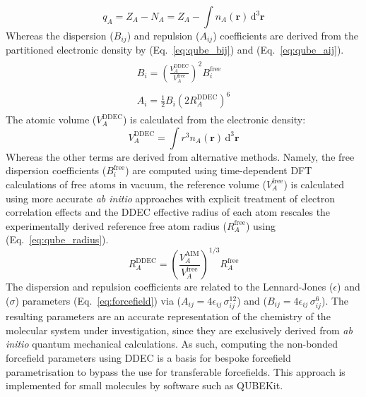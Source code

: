 %
\begin{equation} \label{eq:ddec_charge}
    q_A = Z_A - N_A = Z_A - \int n_A(\mathbf{r}) \, \mathrm{d}^3 \mathbf{r}
\end{equation}
%
Whereas the dispersion ($B_{ij}$) and repulsion ($A_{ij}$) coefficients are derived from the partitioned electronic density by (Eq.~\ref{eq:qube_bij}) and (Eq.~\ref{eq:qube_aij}).\cite{horton2019qubekit}
\vspace{-2mm}
\begin{subequations} 
\begin{align}
\begin{split}\label{eq:qube_bij}
B_{i}=\left(\frac{V_{A}^{\mathrm{DDEC}}}{V_{A}^{\mathrm{free}}}\right)^{2} B_{i}^{\mathrm{free}}
\end{split}\\
\begin{split}\label{eq:qube_aij}
A_{i}=\frac{1}{2} B_{i}\left(2 R_{A}^{\mathrm{DDEC}}\right)^{6}
\end{split}
\end{align}
\end{subequations}
%
The atomic volume ($V_{A}^{\mathrm{DDEC}}$) is calculated from the electronic density:
%
\begin{equation} \label{eq:qube_volume}
V_{A}^{\mathrm{DDEC}}=\int r^{3} n_{A}(\mathbf{r}) \, \mathrm{d}^{3} \mathbf{r}
\end{equation}
%
Whereas the other terms are derived from alternative methods. Namely, the free dispersion coefficients ($B_{i}^{\mathrm{free}}$) are computed using time-dependent DFT calculations of free atoms in vacuum,\cite{chu2004linear} the reference volume ($V_{A}^{\mathrm{free}}$) is calculated using more accurate \textit{ab initio} approaches with explicit treatment of electron correlation effects and the DDEC effective radius of each atom rescales the experimentally derived reference free atom radius ($R_{A}^{\mathrm{free}}$) using (Eq.~\ref{eq:qube_radius}).\cite{horton2019qubekit} 
%
\begin{equation} \label{eq:qube_radius}
R_{A}^{\mathrm{DDEC}}=\left(\frac{V_{A}^{\mathrm{AIM}}}{V_{A}^{\mathrm{free}}}\right)^{1 / 3} R_{A}^{\mathrm{free}}
\end{equation}
%
The dispersion and repulsion coefficients are related to the Lennard-Jones ($\epsilon$) and ($\sigma$) parameters (Eq.~\ref{eq:forcefield}) via ($A_{ij} = 4 \epsilon_{ij}\,\sigma_{ij}^{12}$) and ($B_{ij} = 4 \epsilon_{ij}\,\sigma_{ij}^{6}$). The resulting parameters are an accurate representation of the chemistry of the molecular system under investigation, since they are exclusively derived from \textit{ab initio} quantum mechanical calculations. As such, computing the non-bonded forcefield parameters using DDEC is a basis for bespoke forcefield parametrisation to bypass the use for transferable forcefields. This approach is implemented for small molecules by software such as QUBEKit.\cite{horton2019qubekit} 